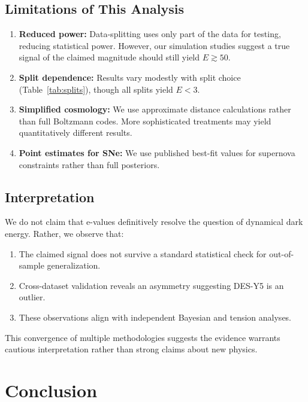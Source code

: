 \documentclass[11pt,a4paper]{article}
\begin{document}
\subsection{Limitations of This Analysis}

\begin{enumerate}
    \item \textbf{Reduced power:} Data-splitting uses only part of the data for testing, reducing statistical power. However, our simulation studies suggest a true signal of the claimed magnitude should still yield $E \gtrsim 50$.

    \item \textbf{Split dependence:} Results vary modestly with split choice (Table~\ref{tab:splits}), though all splits yield $E < 3$.

    \item \textbf{Simplified cosmology:} We use approximate distance calculations rather than full Boltzmann codes. More sophisticated treatments may yield quantitatively different results.

    \item \textbf{Point estimates for SNe:} We use published best-fit values for supernova constraints rather than full posteriors.
\end{enumerate}

\subsection{Interpretation}

We do not claim that e-values definitively resolve the question of dynamical dark energy. Rather, we observe that:
\begin{enumerate}
    \item The claimed signal does not survive a standard statistical check for out-of-sample generalization.
    \item Cross-dataset validation reveals an asymmetry suggesting DES-Y5 is an outlier.
    \item These observations align with independent Bayesian and tension analyses.
\end{enumerate}

This convergence of multiple methodologies suggests the evidence warrants cautious interpretation rather than strong claims about new physics.

\section{Conclusion}
\label{sec:conclusion}
\end{document}
